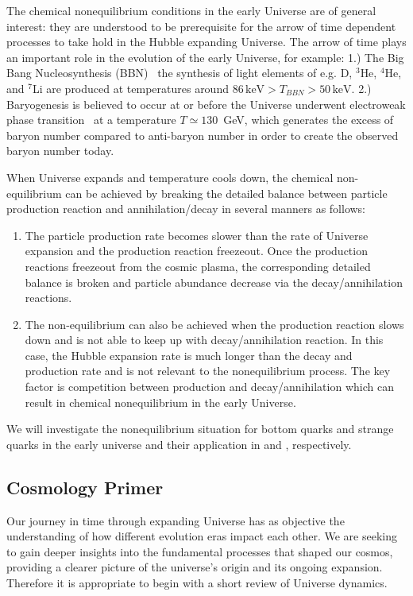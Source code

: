 {The chemical nonequilibrium conditions in the early Universe are of general interest: they are understood to be prerequisite for the arrow of time dependent processes to take hold in the Hubble expanding Universe. The arrow of time plays an important role in the evolution of the early Universe, for example:
 1.) The Big Bang Nucleosynthesis (BBN)~\cite{Pitrou:2018cgg,Kolb:1990vq,Dodelson:2003ft,Mukhanov:2005sc}  the synthesis of light elements of  e.g. D, $^3$He, $^4$He, and $^7$Li are produced at temperatures around $86\,\mathrm{keV}>T_{BBN}>50\,\mathrm{keV}$. 
 2.) Baryogenesis is believed to occur at or before the Universe underwent electroweak phase transition~\cite{Kolb:1990vq} at a temperature $T\simeq 130$\, GeV, which generates the excess of baryon number compared to anti-baryon number in order to create the observed baryon number today.

When Universe expands and temperature cools down, the chemical non-equilibrium can be achieved by breaking the detailed balance between particle production reaction and annihilation/decay in several manners as follows:
\begin{enumerate}
\item The particle production rate becomes slower than the rate of Universe expansion and the production reaction freezeout. Once the production reactions freezeout from the cosmic plasma, the corresponding detailed balance is broken and particle abundance decrease via the decay/annihilation reactions.
%
\item The non-equilibrium can also be achieved when the production reaction slows down and is not able to keep up with decay/annihilation reaction. In this case, the Hubble expansion rate is much longer than the decay and production rate and is not relevant to the nonequilibrium process. The key factor is competition between production and decay/annihilation  which can result in chemical nonequilibrium in the early Universe.
\end{enumerate}
We will investigate the nonequilibrium situation for bottom quarks and strange quarks in the early universe and their application in   and , respectively.  


\subsection{Cosmology Primer}
\label{sec:flrw}
Our journey in time through expanding Universe has as objective the understanding of how different evolution eras impact each other. We are seeking to gain deeper insights into the fundamental processes that shaped our cosmos, providing a clearer picture of the universe's origin and its ongoing expansion. Therefore it is appropriate to begin with a short review of Universe dynamics.

}
